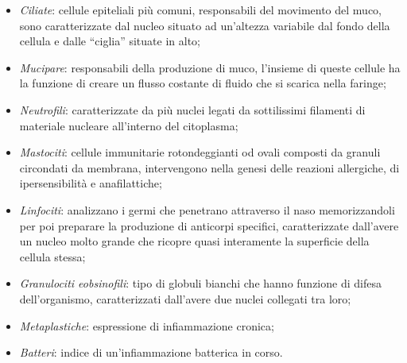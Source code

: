 \documentclass[italian,10pt,a4paper]{article}
\begin{document}
					\begin{itemize}
						\item \textit{Ciliate}: cellule epiteliali più comuni, responsabili del movimento del muco, sono caratterizzate dal nucleo situato ad un’altezza variabile dal fondo della cellula e dalle “ciglia” situate in alto;
						
						\item \textit{Mucipare}: responsabili della produzione di muco, l’insieme di queste cellule ha la funzione di creare un flusso costante di fluido che si scarica nella faringe;
						
						\item \textit{Neutrofili}: caratterizzate da più nuclei legati da sottilissimi filamenti di materiale nucleare all'interno del citoplasma;
						
						\item \textit{Mastociti}: cellule immunitarie rotondeggianti od ovali composti da granuli circondati da membrana, intervengono nella genesi delle reazioni allergiche, di ipersensibilità e anafilattiche;
						
						\item \textit{Linfociti}: analizzano i germi che penetrano attraverso il naso memorizzandoli per poi preparare la produzione di anticorpi specifici, caratterizzate dall’avere un nucleo molto grande che ricopre quasi interamente la superficie della cellula stessa;
						
						\item \textit{Granulociti eobsinofili}: tipo di globuli bianchi che hanno funzione di difesa dell'organismo, caratterizzati dall’avere due nuclei collegati tra loro;
						
						\item \textit{Metaplastiche}: espressione di infiammazione cronica;
		
						\item \textit{Batteri}: indice di un'infiammazione batterica in corso.
						
					\end{itemize} 
			
\end{document}
